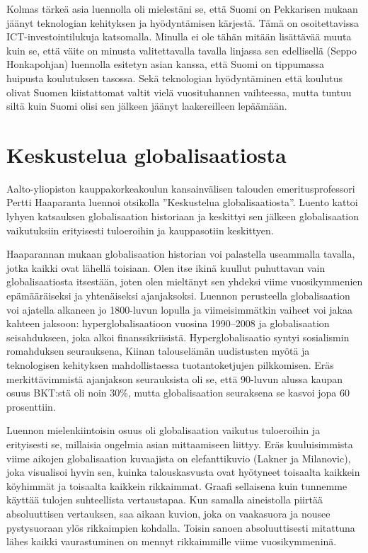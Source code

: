 \documentclass[12pt]{article}
\begin{document}
Kolmas tärkeä asia luennolla oli mielestäni se, että Suomi on Pekkarisen mukaan jäänyt teknologian kehityksen ja hyödyntämisen kärjestä. Tämä on osoitettavissa ICT-investointilukuja katsomalla. Minulla ei ole tähän mitään lisättävää muuta kuin se, että väite on minusta valitettavalla tavalla linjassa sen edellisellä (Seppo Honkapohjan) luennolla esitetyn asian kanssa, että Suomi on tippumassa huipusta koulutuksen tasossa. Sekä teknologian hyödyntäminen että koulutus olivat Suomen kiistattomat valtit vielä vuosituhannen vaihteessa, mutta tuntuu siltä kuin Suomi olisi sen jälkeen jäänyt laakereilleen lepäämään.


\newpage
\section{Keskustelua globalisaatiosta}

Aalto-yliopiston kauppakorkeakoulun kansainvälisen talouden emeritusprofessori Pertti Haaparanta luennoi otsikolla ''Keskustelua globalisaatiosta''. Luento kattoi lyhyen katsauksen globalisaation historiaan ja keskittyi sen jälkeen globalisaation vaikutuksiin erityisesti tuloeroihin ja kauppasotiin keskittyen.

Haaparannan mukaan globalisaation historian voi palastella useammalla tavalla, jotka kaikki ovat lähellä toisiaan. Olen itse ikinä kuullut puhuttavan vain globalisaatiosta itsestään, joten olen mieltänyt sen yhdeksi viime vuosikymmenien epämääräiseksi ja yhtenäiseksi ajanjaksoksi. Luennon perusteella globalisaation voi ajatella alkaneen jo 1800-luvun lopulla ja viimeisimmätkin vaiheet voi jakaa kahteen jaksoon: hyperglobalisaatioon vuosina 1990--2008 ja globalisaation seisahdukseen, joka alkoi finanssikriisistä. Hyperglobalisaatio syntyi sosialismin romahduksen seurauksena, Kiinan talouselämän uudistusten myötä ja teknologisen kehityksen mahdollistaessa tuotantoketjujen pilkkomisen. Eräs merkittävimmistä ajanjakson seurauksista oli se, että 90-luvun alussa kaupan osuus BKT:stä oli noin 30\%, mutta globalisaation seuraksena se kasvoi jopa 60 prosenttiin.

Luennon mielenkiintoisin osuus oli globalisaation vaikutus tuloeroihin ja erityisesti se, millaisia ongelmia asian mittaamiseen liittyy. Eräs kuuluisimmista viime aikojen globalisaation kuvaajista on elefanttikuvio (Lakner ja Milanovic), joka visualisoi hyvin sen, kuinka talouskasvusta ovat hyötyneet toisaalta kaikkein köyhimmät ja toisaalta kaikkein rikkaimmat. Graafi sellaisena kuin tunnemme käyttää tulojen suhteellista vertaustapaa. Kun samalla aineistolla piirtää absoluuttisen vertauksen, saa aikaan kuvion, joka on vaakasuora ja nousee pystysuoraan ylös rikkaimpien kohdalla. Toisin sanoen absoluuttisesti mitattuna lähes kaikki vaurastuminen on mennyt rikkaimmille viime vuosikymmeninä.
\end{document}
